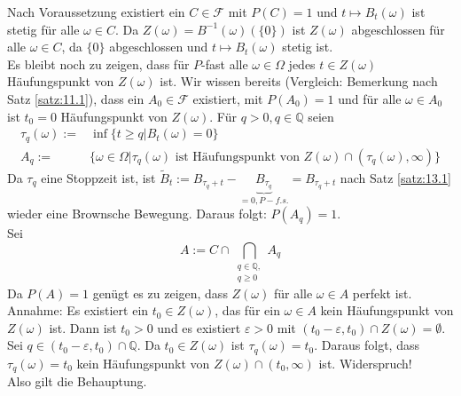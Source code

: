 \documentclass[a4paper,twoside,DIV15,BCOR12mm]{scrbook}
\begin{document}
\begin{beweis}
  Nach Voraussetzung existiert ein $C\in\mathcal F$ mit $P(C)=1$ und $t\mapsto B_t(\omega)$ ist stetig für alle $\omega\in C$. Da $Z(\omega)=B^{-1}(\omega)(\{0\})$ ist $Z(\omega)$ abgeschlossen für alle $\omega\in C$, da $\{0\}$ abgeschlossen und $t\mapsto B_t(\omega)$ stetig ist. \\
Es bleibt noch zu zeigen, dass für $P$-fast alle $\omega\in\Omega$ jedes $t\in Z(\omega)$ Häufungspunkt von $Z(\omega)$ ist. Wir wissen bereits (Vergleich: Bemerkung nach Satz \ref{satz:11.1}), dass ein $A_0\in\mathcal F$ existiert, mit $P(A_0)=1$ und für alle $\omega\in A_0$ ist $t_0=0$ Häufungspunkt von $Z(\omega)$.
Für $q>0,q\in\mathbb Q$ seien
\begin{align*}
  \tau_q(\omega):=&\inf\{t\geq q\vert B_t(\omega)=0\} \\
A_q:=&\{\omega\in\Omega\vert\tau_q(\omega)\text{ ist Häufungspunkt von $Z(\omega)\cap(\tau_q(\omega),\infty)$}\}
\end{align*}
Da $\tau_q$ eine Stoppzeit ist, ist $\tilde B_t:=B_{\tau_q+t}-\underbrace{B_{\tau_q}}_{=0, P-f.s.}=B_{\tau_q+t}$ nach Satz \ref{satz:13.1} wieder eine Brownsche Bewegung. Daraus folgt: $P(A_q)=1$.\\
Sei
\[
A:=C\cap\bigcap_{\begin{array}{c}q\in\mathbb Q,\\q\geq0\end{array}}A_q
\]
Da $P(A)=1$ genügt es zu zeigen, dass $Z(\omega)$ für alle $\omega\in A$ perfekt ist. \\
Annahme: Es existiert ein $t_0\in Z(\omega)$, das für ein $\omega\in A$ kein Häufungspunkt von $Z(\omega)$ ist. Dann ist $t_0>0$ und es existiert $\varepsilon>0$ mit $(t_0-\varepsilon,t_0)\cap Z(\omega)=\emptyset$. Sei $q\in(t_0-\varepsilon,t_0)\cap\mathbb Q$. Da $t_0\in Z(\omega)$ ist $\tau_q(\omega)=t_0$. Daraus folgt, dass $\tau_q(\omega)=t_0$ kein Häufungspunkt von $Z(\omega)\cap(t_0,\infty)$ ist. Widerspruch! \\
Also gilt die Behauptung.
\end{beweis}
\end{document}
